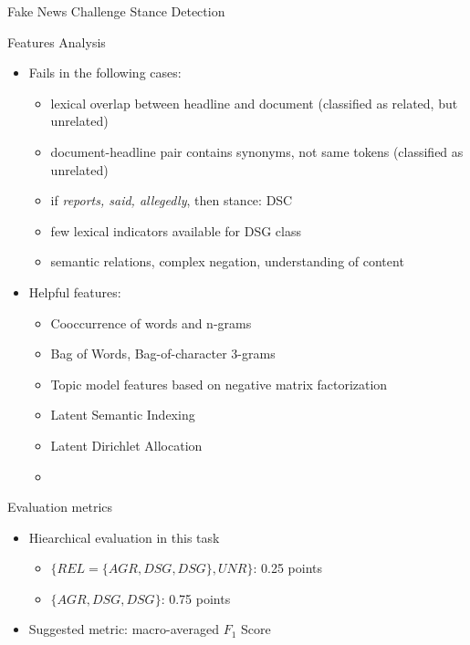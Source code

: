 \documentclass[english,handout]{mlutalk}
\begin{document}
\begin{frame}[allowframebreaks]{Fake News Challenge Stance Detection~\cite{HanselowskiSSCC2018}}
    \framebreak
    \begin{block}{Features Analysis}
      \begin{itemize}
          \item Fails in the following cases:
            \begin{itemize}
                \item lexical overlap between headline and document (classified as related, but unrelated)
                \item document-headline pair contains synonyms, not same tokens (classified as unrelated)
                \item if \textit{reports, said, allegedly}, then stance: DSC
                \item few lexical indicators available for DSG class
                \item semantic relations, complex negation, understanding of content
            \end{itemize}
          \item Helpful features:
          \begin{itemize}
              \item Cooccurrence of words and n-grams
              \item Bag of Words, Bag-of-character 3-grams
              \item Topic model features based on negative matrix factorization
              \item Latent Semantic Indexing
              \item Latent Dirichlet Allocation
              \item 
          \end{itemize}
      \end{itemize}
    \end{block}
    
    \framebreak
    \begin{block}[]
      
    \end{block}
    \begin{block}{Evaluation metrics}
      \begin{itemize}
          \item Hiearchical evaluation in this task
            \begin{itemize}
                \item $\{ REL=\{AGR, DSG, DSG\}, UNR\}$: 0.25 points
                \item $\{AGR, DSG, DSG\}$: 0.75 points
            \end{itemize}
          \item Suggested metric: macro-averaged $F_1$ Score 
      \end{itemize}
    \end{block}
\end{frame}
\end{document}
